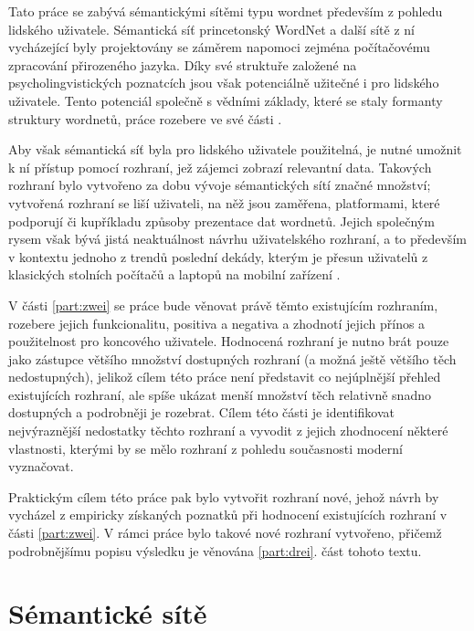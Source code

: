 \documentclass[a4paper, 11pt, oneside]{book}
\begin{document}

		Tato práce se zabývá sémantickými sítěmi typu wordnet především z pohledu lidského uživatele. Sémantická síť princetonský WordNet a další sítě z ní vycházející byly projektovány se záměrem napomoci zejména počítačovému zpracování přirozeného jazyka. Díky své struktuře založené na psycholingvistických poznatcích jsou však potenciálně užitečné i pro lidského uživatele. Tento potenciál společně s vědními základy, které se staly formanty struktury wordnetů, práce rozebere ve své části \ref{part:eins}.

		Aby však sémantická síť byla pro lidského uživatele použitelná, je nutné umožnit k ní přístup pomocí rozhraní, jež zájemci zobrazí relevantní data. Takových rozhraní bylo vytvořeno za dobu vývoje sémantických sítí značné množství; vytvořená rozhraní se liší uživateli, na něž jsou zaměřena, platformami, které podporují či kupříkladu způsoby prezentace dat wordnetů. Jejich společným rysem však bývá jistá neaktuálnost návrhu uživatelského rozhraní, a to především v kontextu jednoho z trendů poslední dekády, kterým je přesun uživatelů z klasických stolních počítačů a laptopů na mobilní zařízení  \parencite{grace2013mobile}.

		V části \ref{part:zwei} se práce bude věnovat právě těmto existujícím rozhraním, rozebere jejich funkcionalitu, positiva a negativa a zhodnotí jejich přínos a použitelnost pro koncového uživatele. Hodnocená rozhraní je nutno brát pouze jako zástupce většího množství dostupných rozhraní (a možná ještě většího těch nedostupných), jelikož cílem této práce není představit co nejúplnější přehled existujících rozhraní, ale spíše ukázat menší množství těch relativně snadno dostupných a podrobněji je rozebrat. Cílem této části je identifikovat nejvýraznější nedostatky těchto rozhraní a vyvodit z jejich zhodnocení některé vlastnosti, kterými by se mělo rozhraní z pohledu současnosti moderní vyznačovat. 

		Praktickým cílem této práce pak bylo vytvořit rozhraní nové, jehož návrh by vycházel z empiricky získaných poznatků při hodnocení existujících rozhraní v části \ref{part:zwei}. V rámci práce bylo takové nové rozhraní vytvořeno, přičemž podrobnějšímu popisu výsledku je věnována \ref{part:drei}. část tohoto textu.

	\newpage

	\part{Sémantické sítě}
	\label{part:eins}
\end{document}
